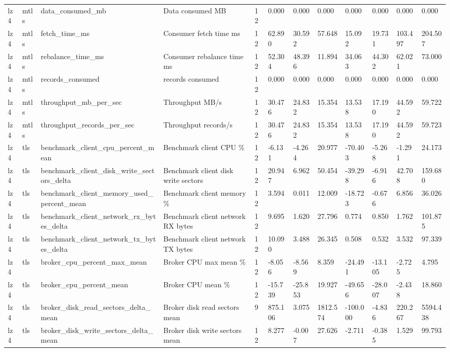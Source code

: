 \begin{longtable}{llllllllllll}
lz4 & mtls & data\_consumed\_mb & Data consumed MB & 12 & 0.000 & 0.000 & 0.000 & 0.000 & 0.000 & 0.000 & 0.000 \\
lz4 & mtls & fetch\_time\_ms & Consumer fetch time ms & 12 & 62.890 & 30.592 & 57.648 & 15.092 & 19.731 & 103.497 & 204.507 \\
lz4 & mtls & rebalance\_time\_ms & Consumer rebalance time ms & 12 & 52.304 & 48.396 & 11.894 & 34.063 & 44.302 & 62.021 & 73.000 \\
lz4 & mtls & records\_consumed & records consumed & 12 & 0.000 & 0.000 & 0.000 & 0.000 & 0.000 & 0.000 & 0.000 \\
lz4 & mtls & throughput\_mb\_per\_sec & Throughput MB/s & 12 & 30.476 & 24.832 & 15.354 & 13.538 & 17.190 & 44.592 & 59.722 \\
lz4 & mtls & throughput\_records\_per\_sec & Throughput records/s & 12 & 30.476 & 24.832 & 15.354 & 13.538 & 17.190 & 44.592 & 59.723 \\
lz4 & tls & benchmark\_client\_cpu\_percent\_mean & Benchmark client CPU \% & 12 & -6.131 & -4.264 & 20.977 & -70.403 & -5.268 & -1.291 & 24.173 \\
lz4 & tls & benchmark\_client\_disk\_write\_sectors\_delta & Benchmark client disk write sectors & 12 & 20.947 & 6.962 & 50.454 & -39.298 & -6.916 & 42.708 & 159.680 \\
lz4 & tls & benchmark\_client\_memory\_used\_percent\_mean & Benchmark client memory \% & 12 & 3.594 & 0.011 & 12.009 & -18.723 & -0.676 & 6.856 & 36.026 \\
lz4 & tls & benchmark\_client\_network\_rx\_bytes\_delta & Benchmark client network RX bytes & 12 & 9.695 & 1.620 & 27.796 & 0.774 & 0.850 & 1.762 & 101.875 \\
lz4 & tls & benchmark\_client\_network\_tx\_bytes\_delta & Benchmark client network TX bytes & 12 & 10.090 & 3.488 & 26.345 & 0.508 & 0.532 & 3.532 & 97.339 \\
lz4 & tls & broker\_cpu\_percent\_max\_mean & Broker CPU max mean \% & 12 & -8.056 & -8.569 & 8.359 & -24.491 & -13.105 & -2.725 & 4.795 \\
lz4 & tls & broker\_cpu\_percent\_mean & Broker CPU mean \% & 12 & -15.739 & -25.853 & 19.927 & -49.656 & -28.007 & -2.438 & 18.860 \\
lz4 & tls & broker\_disk\_read\_sectors\_delta\_mean & Broker disk read sectors mean & 9 & 875.106 & 3.075 & 1812.574 & -100.000 & -4.836 & 220.267 & 5594.438 \\
lz4 & tls & broker\_disk\_write\_sectors\_delta\_mean & Broker disk write sectors mean & 12 & 8.277 & -0.007 & 27.626 & -2.711 & -0.385 & 1.529 & 99.793 \\

\end{longtable}
